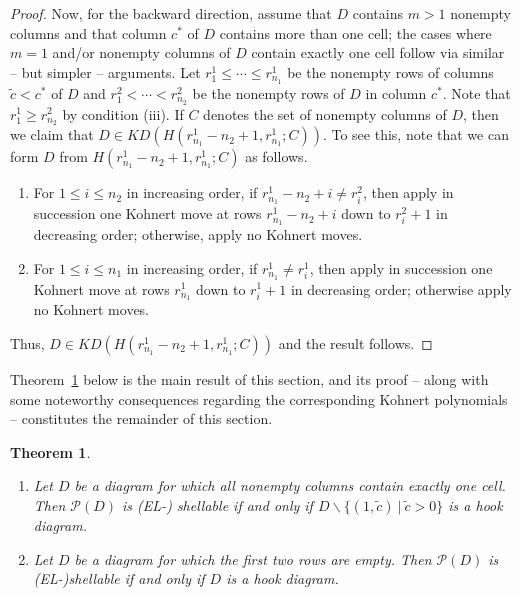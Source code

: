 \documentclass[letterpaper,10pt]{article}
\newtheorem{theorem}{Theorem}
\begin{document}
\begin{proof}
    Now, for the backward direction, assume that $D$ contains $m>1$ nonempty columns and that column $c^*$ of $D$ contains more than one cell; the cases where $m=1$ and/or nonempty columns of $D$ contain exactly one cell follow via similar -- but simpler -- arguments. Let $r^1_1\le\cdots\le r^1_{n_1}$ be the nonempty rows of columns $\tilde{c}<c^*$ of $D$ and $r^2_1<\cdots<r^2_{n_2}$ be the nonempty rows of $D$ in column $c^*$. Note that $r^1_{1}\ge r^2_{n_2}$ by condition (iii). If $C$ denotes the set of nonempty columns of $D$, then we claim that $D\in KD(H(r^1_{n_1}-n_2+1,r_{n_1}^1;C))$. To see this, note that we can form $D$ from $H(r^1_{n_1}-n_2+1,r_{n_1}^1;C)$ as follows. 
    \begin{enumerate}
        \item For $1\le i\le n_2$ in increasing order, if $r^1_{n_1}-n_2+i\neq r^2_i$, then apply in succession one Kohnert move at rows $r^1_{n_1}-n_2+i$ down to $r^2_i+1$ in decreasing order; otherwise, apply no Kohnert moves.
        \item For $1\le i\le n_1$ in increasing order, if $r^1_{n_1}\neq r^1_i$, then apply in succession one Kohnert move at rows $r^1_{n_1}$ down to $r^1_i+1$ in decreasing order; otherwise apply no Kohnert moves.
    \end{enumerate}
    Thus, $D\in KD(H(r^1_{n_1}-n_2+1,r_{n_1}^1;C))$ and the result follows.
\end{proof}



Theorem~\ref{thm:hook} below is the main result of this section, and its proof -- along with some noteworthy consequences regarding the corresponding Kohnert polynomials -- constitutes the remainder of this section.


\begin{theorem}\label{thm:hook}~
    \begin{enumerate}
        \item[\textup{(a)}] Let $D$ be a diagram for which all nonempty columns contain exactly one cell. Then $\mathcal{P}(D)$ is \textup(EL-\textup) shellable if and only if $D\backslash\{(1,\tilde{c})~|~\tilde{c}>0\}$ is a hook diagram.
        \item[\textup{(b)}] Let $D$ be a diagram for which the first two rows are empty. Then $\mathcal{P}(D)$ is \textup(EL-\textup)shellable if and only if $D$ is a hook diagram.
    \end{enumerate}
\end{theorem}
\end{document}

